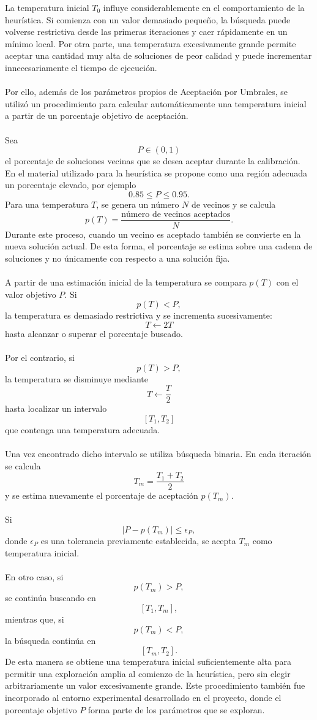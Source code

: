\documentclass[12pt]{article}
\begin{document}
La temperatura inicial \(T_0\) influye considerablemente en el
comportamiento de la heurística. Si comienza con un valor demasiado pequeño,
la búsqueda puede volverse restrictiva desde las primeras iteraciones y caer
rápidamente en un mínimo local. Por otra parte, una temperatura excesivamente
grande permite aceptar una cantidad muy alta de soluciones de peor calidad y
puede incrementar innecesariamente el tiempo de ejecución.
\\\\
Por ello, además de los parámetros propios de Aceptación por Umbrales, se
utilizó un procedimiento para calcular automáticamente una temperatura
inicial a partir de un porcentaje objetivo de aceptación.
\\\\
Sea
\[
    P\in(0,1)
\]
el porcentaje de soluciones vecinas que se desea aceptar durante la
calibración. En el material utilizado para la heurística se propone como una
región adecuada un porcentaje elevado, por ejemplo
\[
    0.85\leq P\leq 0.95.
\]
Para una temperatura \(T\), se genera un número \(N\) de vecinos y se
calcula
\[
    p(T)=
    \frac{\text{número de vecinos aceptados}}{N}.
\]
Durante este proceso, cuando un vecino es aceptado también se convierte en
la nueva solución actual. De esta forma, el porcentaje se estima sobre una
cadena de soluciones y no únicamente con respecto a una solución fija.
\\\\
A partir de una estimación inicial de la temperatura se compara
\(p(T)\) con el valor objetivo \(P\). Si
\[
    p(T)<P,
\]
la temperatura es demasiado restrictiva y se incrementa sucesivamente:
\[
    T\leftarrow 2T
\]
hasta alcanzar o superar el porcentaje buscado.
\\\\
Por el contrario, si
\[
    p(T)>P,
\]
la temperatura se disminuye mediante
\[
    T\leftarrow\frac{T}{2}
\]
hasta localizar un intervalo
\[
    [T_1,T_2]
\]
que contenga una temperatura adecuada.
\\\\
Una vez encontrado dicho intervalo se utiliza búsqueda binaria. En cada
iteración se calcula
\[
    T_m=
    \frac{T_1+T_2}{2}
\]
y se estima nuevamente el porcentaje de aceptación \(p(T_m)\).
\\\\
Si
\[
    \left|P-p(T_m)\right|
    \leq
    \epsilon_P,
\]
donde \(\epsilon_P\) es una tolerancia previamente establecida, se acepta
\(T_m\) como temperatura inicial.
\\\\
En otro caso, si
\[
    p(T_m)>P,
\]
se continúa buscando en
\[
    [T_1,T_m],
\]
mientras que, si
\[
    p(T_m)<P,
\]
la búsqueda continúa en
\[
    [T_m,T_2].
\]
De esta manera se obtiene una temperatura inicial suficientemente alta para
permitir una exploración amplia al comienzo de la heurística, pero sin
elegir arbitrariamente un valor excesivamente grande. Este procedimiento
también fue incorporado al entorno experimental desarrollado en el proyecto,
donde el porcentaje objetivo \(P\) forma parte de los parámetros que se
exploran.
\end{document}
